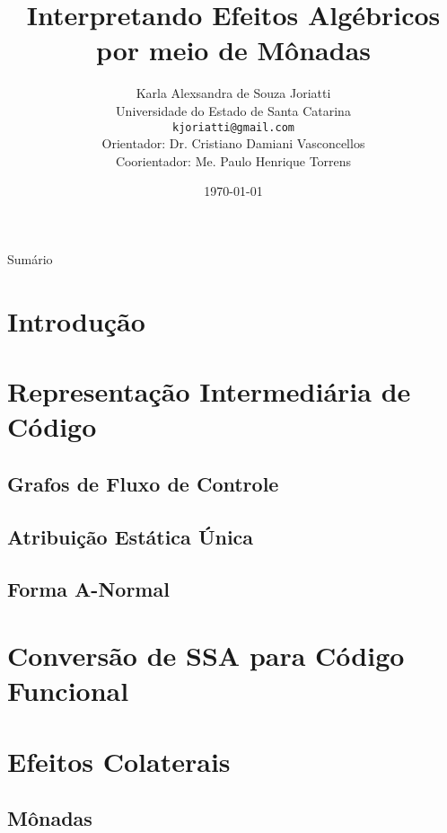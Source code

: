 \documentclass[xcolor=table]{beamer}
\title{Interpretando Efeitos Algébricos por meio de Mônadas}
\author[Karla A S Joriatti]{
    Karla Alexsandra de Souza Joriatti\\\smallskip
    {\scriptsize Universidade do Estado de Santa Catarina \\\smallskip
    \vspace{-2mm}
    \texttt{kjoriatti@gmail.com}\\\medskip
    {Orientador: Dr. Cristiano Damiani Vasconcellos}\\
    {Coorientador: Me. Paulo Henrique Torrens}\\
    }
}
\date{\today}
\begin{document}
    \begin{frame}
        \titlepage
    \end{frame}

    \begin{frame}[allowframebreaks]{Sumário}
        \tableofcontents
    \end{frame}

    \section[]{Introdução}
    
    


    \section[]{Representação Intermediária de Código}
    
    \subsection{Grafos de Fluxo de Controle}
    
    \subsection{Atribuição Estática Única}
    
    \subsection{Forma A-Normal}
    
    

    \section[]{Conversão de SSA para Código Funcional}
    

    \section[]{Efeitos Colaterais}
    
    \subsection{Mônadas}
    
\end{document}
